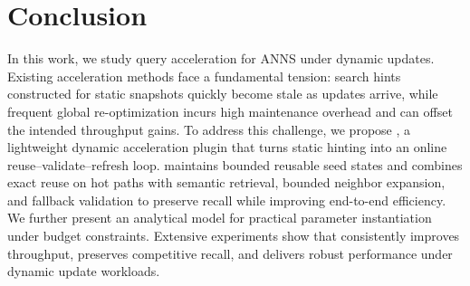 \section{Conclusion}
In this work, we study query acceleration for ANNS under dynamic updates. Existing acceleration methods face a fundamental tension: search hints constructed for static snapshots quickly become stale as updates arrive, while frequent global re-optimization incurs high maintenance overhead and can offset the intended throughput gains. To address this challenge, we propose \system, a lightweight dynamic acceleration plugin that turns static hinting into an online reuse--validate--refresh loop. \system maintains bounded reusable seed states and combines exact reuse on hot paths with semantic retrieval, bounded neighbor expansion, and fallback validation to preserve recall while improving end-to-end efficiency. We further present an analytical model for practical parameter instantiation under budget constraints. Extensive experiments show that \system consistently improves throughput, preserves competitive recall, and delivers robust performance under dynamic update workloads.